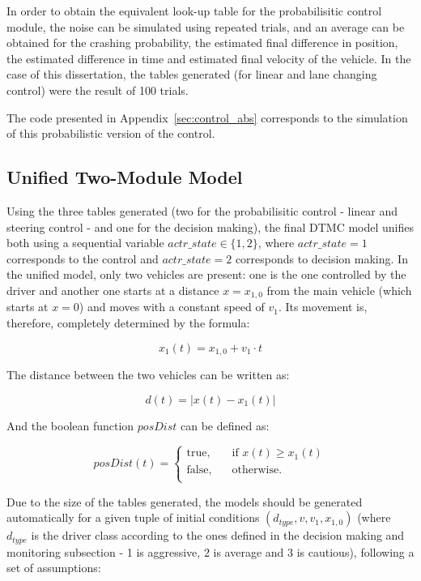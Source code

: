 In order to obtain the equivalent look-up table for the probabilisitic control module, the noise can be simulated using repeated trials, and an average can be obtained for the crashing probability, the estimated final difference in position, the estimated difference in time and estimated final velocity of the vehicle. In the case of this dissertation, the tables generated (for linear and lane changing control) were the result of 100 trials.

The code presented in Appendix~\ref{sec:control_abs} corresponds to the simulation of this probabilistic version of the control.

\subsection{Unified Two-Module Model}

Using the three tables generated (two for the probabilisitic control - linear and steering control - and one for the decision making), the final DTMC model unifies both using a sequential variable $actr\_state \in \{1,2\}$, where $actr\_state = 1$ corresponds to the control and $actr\_state = 2$ corresponds to decision making. In the unified model, only two vehicles are present: one is the one controlled by the driver and another one starts at a distance $x = x_{1,0}$ from the main vehicle (which starts at $x=0$) and moves with a constant speed of $v_1$. Its movement is, therefore, completely determined by the formula:

\begin{equation}
	x_1(t) = x_{1,0} + v_1\cdot t
\end{equation}

The distance between the two vehicles can be written as:

\begin{equation}
	d(t) = \lvert x(t) - x_1(t) \rvert
\end{equation}

And the boolean function $posDist$ can be defined as:

\begin{equation}
posDist(t) = 
     \begin{cases}
       \text{true,} &\quad\text{if }x(t) \geq x_1(t)\\
       \text{false,} &\quad\text{otherwise.} \\
     \end{cases}
\end{equation}

Due to the size of the tables generated, the models should be generated automatically for a given tuple of initial conditions $(d_{type}, v, v_1, x_{1,0})$ (where $d_{type}$ is the driver class according to the ones defined in the decision making and monitoring subsection - 1 is aggressive, 2 is average and 3 is cautious), following a set of assumptions:

